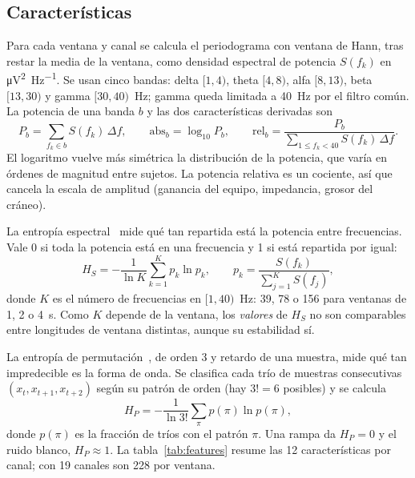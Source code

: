 \documentclass[11pt,a4paper]{article}
\begin{document}
\subsection{Características}
Para cada ventana y canal se calcula el periodograma con ventana de Hann, tras restar la media de la ventana, como densidad espectral de potencia $S(f_k)$ en \si{\micro\volt\squared\per\hertz}. Se usan cinco bandas: delta $[1, 4)$, theta $[4, 8)$, alfa $[8, 13)$, beta $[13, 30)$ y gamma $[30, 40)$~Hz; gamma queda limitada a 40~Hz por el filtro común. La potencia de una banda $b$ y las dos características derivadas son
\begin{equation}
  P_b = \sum_{f_k \in b} S(f_k)\,\Delta f, \qquad
  \mathrm{abs}_b = \log_{10} P_b, \qquad
  \mathrm{rel}_b = \frac{P_b}{\sum_{1 \le f_k < 40} S(f_k)\,\Delta f}.
\end{equation}
El logaritmo vuelve más simétrica la distribución de la potencia, que varía en órdenes de magnitud entre sujetos. La potencia relativa es un cociente, así que cancela la escala de amplitud (ganancia del equipo, impedancia, grosor del cráneo).

La entropía espectral~\cite{inouye1991} mide qué tan repartida está la potencia entre frecuencias. Vale 0 si toda la potencia está en una frecuencia y 1 si está repartida por igual:
\begin{equation}
  H_S = -\frac{1}{\ln K} \sum_{k=1}^{K} p_k \ln p_k, \qquad p_k = \frac{S(f_k)}{\sum_{j=1}^{K} S(f_j)},
\end{equation}
donde $K$ es el número de frecuencias en $[1, 40)$~Hz: 39, 78 o 156 para ventanas de 1, 2 o 4~s. Como $K$ depende de la ventana, los \emph{valores} de $H_S$ no son comparables entre longitudes de ventana distintas, aunque su estabilidad sí.

La entropía de permutación~\cite{bandt2002}, de orden 3 y retardo de una muestra, mide qué tan impredecible es la forma de onda. Se clasifica cada trío de muestras consecutivas $(x_t, x_{t+1}, x_{t+2})$ según su patrón de orden (hay $3! = 6$ posibles) y se calcula
\begin{equation}
  H_P = -\frac{1}{\ln 3!} \sum_{\pi} p(\pi) \ln p(\pi),
\end{equation}
donde $p(\pi)$ es la fracción de tríos con el patrón $\pi$. Una rampa da $H_P = 0$ y el ruido blanco, $H_P \approx 1$. La tabla~\ref{tab:features} resume las 12 características por canal; con 19 canales son 228 por ventana.
\end{document}
